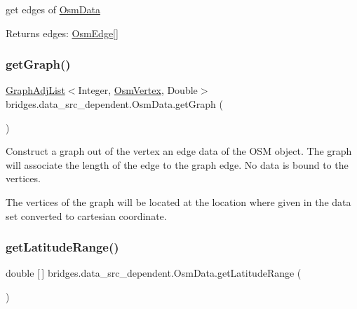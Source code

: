 get edges of \mbox{\hyperlink{classbridges_1_1data__src__dependent_1_1_osm_data}{Osm\+Data}} \begin{DoxyReturn}{Returns}
edges\+: \mbox{\hyperlink{classbridges_1_1data__src__dependent_1_1_osm_edge}{Osm\+Edge}}\mbox{[}\mbox{]} 
\end{DoxyReturn}
\mbox{\label{classbridges_1_1data__src__dependent_1_1_osm_data_a4f5282b7b11ef6e4a248a05c35fe3787}} 
\subsubsection{\texorpdfstring{get\+Graph()}{getGraph()}}
{\footnotesize\ttfamily \mbox{\hyperlink{classbridges_1_1base_1_1_graph_adj_list}{Graph\+Adj\+List}}$<$Integer, \mbox{\hyperlink{classbridges_1_1data__src__dependent_1_1_osm_vertex}{Osm\+Vertex}}, Double$>$ bridges.\+data\+\_\+src\+\_\+dependent.\+Osm\+Data.\+get\+Graph (\begin{DoxyParamCaption}{ }\end{DoxyParamCaption})}

Construct a graph out of the vertex an edge data of the O\+SM object. The graph will associate the length of the edge to the graph edge. No data is bound to the vertices.

The vertices of the graph will be located at the location where given in the data set converted to cartesian coordinate. \mbox{\label{classbridges_1_1data__src__dependent_1_1_osm_data_a406042fe56541f04c059a1f1ec887c81}} 
\subsubsection{\texorpdfstring{get\+Latitude\+Range()}{getLatitudeRange()}}
{\footnotesize\ttfamily double \mbox{[}$\,$\mbox{]} bridges.\+data\+\_\+src\+\_\+dependent.\+Osm\+Data.\+get\+Latitude\+Range (\begin{DoxyParamCaption}{ }\end{DoxyParamCaption})}

